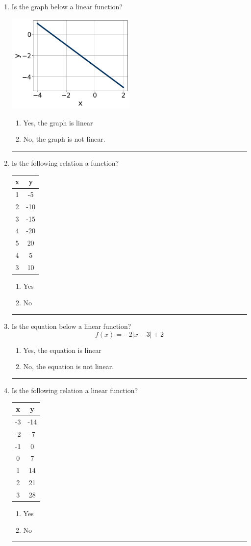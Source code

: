 \documentclass[14pt]{extbook}
\newcommand{\litem}[1]{\item#1\hspace*{-1cm}\rule{\textwidth}{0.4pt}}
\begin{document}
\begin{enumerate}
{\begin{enumerate}[label=\Alph*.]
\end{enumerate} }
\litem{
Is the graph below a linear function?
\begin{center}
    \includegraphics[width=0.5\textwidth]{../Figures/MA_8_F_1_2_graphH.png}
\end{center}
\begin{enumerate}[label=\Alph*.]
\item Yes, the graph is linear
\item No, the graph is not linear.

\end{enumerate} }
\litem{
Is the following relation a function?

\begin{tabular}{c|c}
x &y\tabularnewline \hline
1 &-5\tabularnewline \hline
2 &-10\tabularnewline \hline
3 &-15\tabularnewline \hline
4 &-20\tabularnewline \hline
5 &20\tabularnewline \hline
4 &5\tabularnewline \hline
3 &10\end{tabular}\begin{enumerate}[label=\Alph*.]
\item Yes
\item No

\end{enumerate} }
\litem{
Is the equation below a linear function?\[ f(x) = -2|x -3|+2 \]\begin{enumerate}[label=\Alph*.]
\item Yes, the equation is linear
\item No, the equation is not linear.

\end{enumerate} }
\litem{
Is the following relation a linear function?

\begin{tabular}{c|c}
x &y\tabularnewline \hline
-3 &-14\tabularnewline \hline
-2 &-7\tabularnewline \hline
-1 &0\tabularnewline \hline
0 &7\tabularnewline \hline
1 &14\tabularnewline \hline
2 &21\tabularnewline \hline
3 &28\end{tabular}\begin{enumerate}[label=\Alph*.]
\item Yes
\item No


\end{enumerate}}
\end{enumerate}
\end{document}
